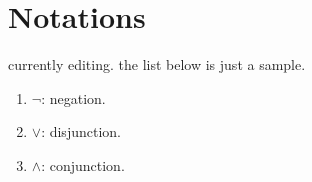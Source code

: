 \documentclass[a4paper,12pt]{article}
\begin{document}
\section*{Notations}
currently editing. the list below is just a sample.

\begin{enumerate}
    \renewcommand{\labelenumi}{\(\diamond\)}
    \item
          \( \neg \)\;:\;
          negation.

    \item
          \( \vee \)\;:\;
          disjunction.

    \item
          \( \wedge \)\;:\;
          conjunction.
\end{enumerate}
\end{document}
